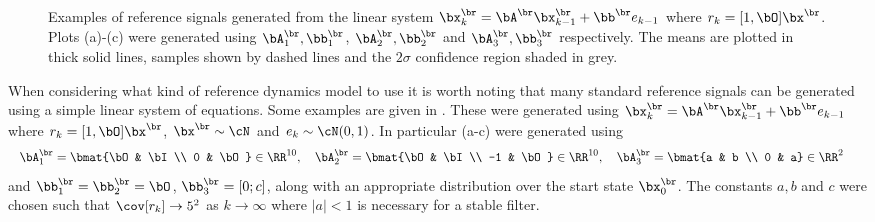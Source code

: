 \begin{figure}[t]
{
\label{fig:linref2}
}
%
%
\caption{Examples of reference signals generated from the linear system $\bx^{\br}_k = \bA^{\br}\bx^{\br}_{k-1} + \bb^{\br}e_{k-1}$ where $r_k = [1,\bO]\bx^{\br}$. Plots (a)-(c) were generated using $\bA^{\br}_1, \bb^{\br}_1$, $\bA^{\br}_2, \bb^{\br}_2$ and $\bA^{\br}_3, \bb^{\br}_3$ respectively. The means are plotted in thick solid lines, samples shown by dashed lines and the $2\sigma$ confidence region shaded in grey.}
\label{fig:linrefs}
\end{figure}

When considering what kind of reference dynamics model to use it is worth noting that many standard reference signals can be generated using a simple linear system of equations. Some examples are given in . These were generated using $\bx^{\br}_k = \bA^{\br}\bx^{\br}_{k-1} + \bb ^{\br}e_{k-1}$ where $r_k = [1,\bO]\bx^{\br}$, $\bx^{\br} \sim \cN$ and $e_k \sim \cN(0,1)$. In particular (a-c) were generated using 
\begin{align*}
\bA_1^{\br} &= \bmat{\bO & \bI \\ 0 & \bO} \in \RR^{10}, \quad
\bA_2^{\br} = \bmat{\bO & \bI \\ -1 & \bO} \in \RR^{10}, \quad
\bA_3^{\br} = \bmat{a & b \\ 0 & a} \in \RR^{2} 
\end{align*}
and $\bb_1^{\br} = \bb_2^{\br} = \bO$, $\bb_3^{\br} = [0;c]$, along with an appropriate distribution over the start state $\bx^{\br}_0$. The constants $a,b$ and $c$ were chosen such that $\cov[r_k] \rightarrow 5^2$ as $k \rightarrow \infty$ where $|a| <1$ is necessary for a stable filter.

